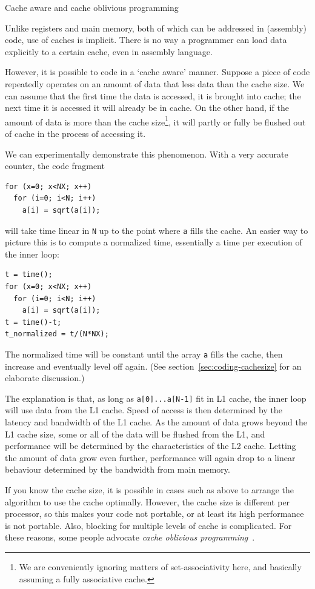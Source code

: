  {Cache aware and cache oblivious programming}

Unlike registers and main memory, both of
which can be addressed in (assembly) code, use of caches is
implicit. There is no way a programmer can load data explicitly to a
certain cache, even in assembly language. 

However, it is possible to code in a `cache aware' manner. Suppose a
piece of code repeatedly operates on an amount of data that less data
than the cache size. We can assume that the first time the data is
accessed, it is brought into cache; the next time it is accessed it
will already be in cache. On the other hand, if the amount of data is
more than the cache size\footnote{We are conveniently ignoring matters
  of set-associativity here, and basically assuming a fully
  associative cache.}, it will partly or fully be flushed out of cache
in the process of accessing it.

We can experimentally demonstrate this phenomenon. With a very
accurate counter, the code fragment
\begin{verbatim}
for (x=0; x<NX; x++)
  for (i=0; i<N; i++)
    a[i] = sqrt(a[i]);
\end{verbatim}
will take time linear in \texttt{N} up to the point where \texttt{a}
fills the cache. An easier way to picture this is to compute a
normalized time, essentially a time per execution of the inner loop:
\begin{verbatim}
t = time();
for (x=0; x<NX; x++)
  for (i=0; i<N; i++)
    a[i] = sqrt(a[i]);
t = time()-t;
t_normalized = t/(N*NX);
\end{verbatim}
The normalized time will be constant until the array \texttt{a} fills
the cache, then increase and eventually level off again. (See
section~\ref{sec:coding-cachesize} for an elaborate discussion.)

The explanation is that,
as long as \texttt{a[0]...a[N-1]} fit in L1 cache, the inner loop will
use data from the L1 cache. Speed of access is then determined by the
latency and bandwidth of the L1 cache.
As the amount of data grows beyond the L1 cache size, some or all of
the data will be flushed from the L1, and performance will be determined by
the characteristics of the L2 cache. Letting the amount of data grow
even further, performance will again drop to a linear behaviour
determined by the bandwidth from main memory.


If you know the cache size, it is possible in cases such as above to
arrange the algorithm to use the cache optimally. However, the cache
size is different per processor, so this makes your code not portable,
or at least its high performance is not portable. Also, blocking for
multiple levels of cache is complicated. For these reasons, some
people advocate \emph{cache oblivious
  programming}~\cite{Frigo:oblivious}. 

